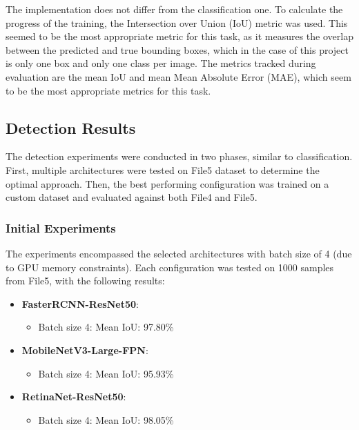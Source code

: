 \documentclass[conference]{IEEEtran}
\begin{document}
The implementation does not differ from the classification one. To calculate the progress of the training, the Intersection over Union (IoU) metric was used. This 
seemed to be the most appropriate metric for this task, as it measures the overlap between the predicted and true bounding boxes, which in the
case of this project is only one box and only one class per image. The metrics tracked during evaluation are the mean IoU and mean Mean Absolute Error (MAE),
which seem to be the most appropriate metrics for this task.

\subsection{Detection Results}

The detection experiments were conducted in two phases, similar to classification. First, multiple architectures were tested on File5
dataset to determine the optimal approach. Then, the best performing configuration was trained on a custom dataset and
evaluated against both File4 and File5.

\subsubsection{Initial Experiments}

The experiments encompassed the selected architectures with batch size of 4 (due to GPU memory constraints). Each
configuration was tested on 1000 samples from File5, with the following results:

\begin{itemize}
  \item \textbf{FasterRCNN-ResNet50}:
    \begin{itemize}
        \item Batch size 4: Mean IoU: 97.80\%
    \end{itemize}
    
  \item \textbf{MobileNetV3-Large-FPN}:
    \begin{itemize}
        \item Batch size 4: Mean IoU: 95.93\% 
    \end{itemize}

  \item \textbf{RetinaNet-ResNet50}:
    \begin{itemize}
        \item Batch size 4: Mean IoU: 98.05\%
    \end{itemize}
\end{itemize}
\end{document}
